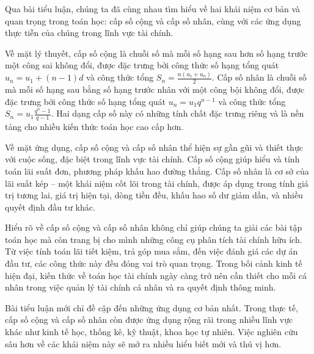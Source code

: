 \documentclass[12pt,a4paper]{report}
\begin{document}
Qua bài tiểu luận, chúng ta đã cùng nhau tìm hiểu về hai khái niệm cơ bản và quan trọng trong toán học: cấp số cộng và cấp số nhân, cùng với các ứng dụng thực tiễn của chúng trong lĩnh vực tài chính.

Về mặt lý thuyết, cấp số cộng là chuỗi số mà mỗi số hạng sau hơn số hạng trước một công sai không đổi, được đặc trưng bởi công thức số hạng tổng quát $u_n = u_1 + (n - 1)d$ và công thức tổng $S_n = \frac{n(u_1 + u_n)}{2}$. Cấp số nhân là chuỗi số mà mỗi số hạng sau bằng số hạng trước nhân với một công bội không đổi, được đặc trưng bởi công thức số hạng tổng quát $u_n = u_1q^{n-1}$ và công thức tổng $S_n = u_1\frac{q^n - 1}{q - 1}$. Hai dạng cấp số này có những tính chất đặc trưng riêng và là nền tảng cho nhiều kiến thức toán học cao cấp hơn.

Về mặt ứng dụng, cấp số cộng và cấp số nhân thể hiện sự gần gũi và thiết thực với cuộc sống, đặc biệt trong lĩnh vực tài chính. Cấp số cộng giúp hiểu và tính toán lãi suất đơn, phương pháp khấu hao đường thẳng. Cấp số nhân là cơ sở của lãi suất kép -- một khái niệm cốt lõi trong tài chính, được áp dụng trong tính giá trị tương lai, giá trị hiện tại, dòng tiền đều, khấu hao số dư giảm dần, và nhiều quyết định đầu tư khác.

Hiểu rõ về cấp số cộng và cấp số nhân không chỉ giúp chúng ta giải các bài tập toán học mà còn trang bị cho mình những công cụ phân tích tài chính hữu ích. Từ việc tính toán lãi tiết kiệm, trả góp mua sắm, đến việc đánh giá các dự án đầu tư, các công thức này đều đóng vai trò quan trọng. Trong bối cảnh kinh tế hiện đại, kiến thức về toán học tài chính ngày càng trở nên cần thiết cho mỗi cá nhân trong việc quản lý tài chính cá nhân và ra quyết định thông minh.

Bài tiểu luận mới chỉ đề cập đến những ứng dụng cơ bản nhất. Trong thực tế, cấp số cộng và cấp số nhân còn được ứng dụng rộng rãi trong nhiều lĩnh vực khác như kinh tế học, thống kê, kỹ thuật, khoa học tự nhiên. Việc nghiên cứu sâu hơn về các khái niệm này sẽ mở ra nhiều hiểu biết mới và thú vị hơn.

\end{document}
